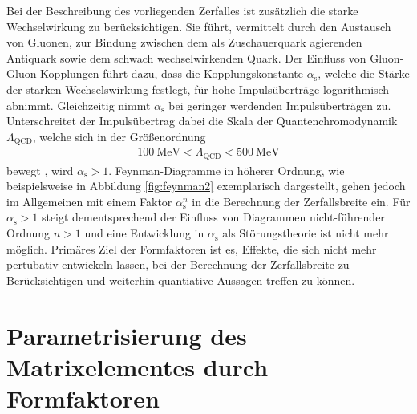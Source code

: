 Bei der Beschreibung des vorliegenden Zerfalles ist zusätzlich die starke Wechselwirkung zu berücksichtigen.
Sie führt, vermittelt durch den Austausch von Gluonen, zur Bindung zwischen dem als Zuschauerquark agierenden Antiquark sowie dem schwach wechselwirkenden Quark.
Der Einfluss von Gluon-Gluon-Kopplungen führt dazu, dass die Kopplungskonstante $\alpha_\text{s}$, welche die Stärke der starken Wechselswirkung festlegt, für hohe Impulsüberträge logarithmisch abnimmt.
Gleichzeitig nimmt $\alpha_\text{s}$ bei geringer werdenden Impulsüberträgen zu.
Unterschreitet der Impulsübertrag dabei die Skala der Quantenchromodynamik $\Lambda_\text{QCD}$, welche sich in der Größenordnung
\begin{align*}
  \SI{100}{\mega\electronvolt} < \Lambda_\text{QCD} < \SI{500}{\mega\electronvolt}
\end{align*}
bewegt \cite{griffiths2008introduction}, wird $\alpha_\text{s} > 1$.
Feynman-Diagramme in höherer Ordnung, wie beispielsweise in Abbildung \ref{fig:feynman2} exemplarisch dargestellt, gehen jedoch im Allgemeinen mit einem Faktor $\alpha_\text{s}^n$ in die Berechnung der Zerfallsbreite ein.
Für $\alpha_\text{s} > 1$ steigt dementsprechend der Einfluss von Diagrammen nicht-führender Ordnung $n>1$ und eine Entwicklung in $\alpha_\text{s}$ als Störungstheorie ist nicht mehr möglich.
Primäres Ziel der Formfaktoren ist es, Effekte, die sich nicht mehr pertubativ entwickeln lassen, bei der Berechnung der Zerfallsbreite zu Berücksichtigen und weiterhin quantiative Aussagen treffen zu können.

\section{Parametrisierung des Matrixelementes durch Formfaktoren}

